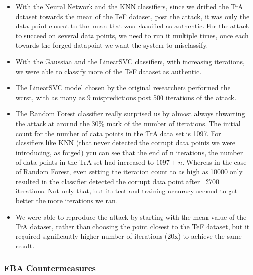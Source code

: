 \documentclass{article}
\begin{document}
\begin{itemize}
\item With the Neural Network and the KNN classifiers, since we drifted the TrA dataset towards the mean of the TeF dataset, post the attack, it was only the data point closest to the mean that was classified as authentic. For the attack to succeed on several data points, we need to run it multiple times, once each towards the forged datapoint we want the system to misclassify.
\item With the Gaussian and the LinearSVC classifiers, with increasing iterations, we were able to classify more of the TeF dataset as authentic. 
\item The LinearSVC model chosen by the original researchers performed the worst, with as many as 9 mispredictions post 500 iterations of the attack.
\item The Random Forest classifier really surprised us by almost always thwarting the attack at around the 30\% mark of the number of iterations. The initial count for the number of data points in the TrA data set is 1097. For classifiers like KNN (that never detected the corrupt data points we were introducing, as forged) you can see that the end of n iterations, the number of data points in the TrA set had increased to $1097 + n$. Whereas in the case of Random Forest, even setting the iteration count to as high as 10000 only resulted in the classifier detected the corrupt data point after ~2700 iterations. Not only that, but its test and training accuracy seemed to get better the more iterations we ran.
\item We were able to reproduce the attack by starting with the mean value of the TrA dataset, rather than choosing the point closest to the TeF dataset, but it required significantly higher number of iterations (20x) to achieve the same result.
\end{itemize}

\subsubsection{FBA Countermeasures}
\end{document}
